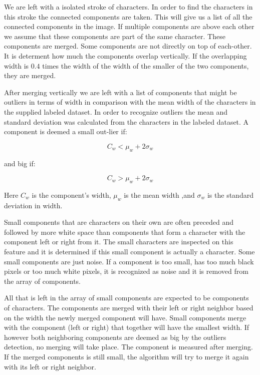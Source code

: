 

We are left with a isolated stroke of characters. In order to find the characters in this stroke the connected components are taken. This will give us a list of all the connected components in the image. If multiple components are above each other we assume that these components are part of the same character. These components are merged. Some components are not directly on top of each-other. It is determent how much the components overlap vertically. If the overlapping width is $0.4$ times the width of the width of the smaller of the two components, they are merged. 

After merging vertically we are left with a list of components that might be outliers in terms of width in comparison with the mean width of the characters in the supplied labeled dataset. In order to recognize outliers the mean and standard deviation was calculated from the characters in the labeled dataset. A component is deemed a small out-lier if:

\begin{equation}
C_w < \mu_w + 2 \sigma_w 
\end{equation}

and big if:

\begin{equation}
C_w > \mu_w + 2 \sigma_w 
\end{equation}

Here $C_w$ is the component's width, $\mu_w$ is the mean width ,and $\sigma_w$ is the standard deviation in width.


Small components that are characters on their own are often preceded and followed by more white space than components that form a character with the component left or right from it. The small characters are inspected on this feature and it is determined if this small component is actually a character. Some small components are just noise. If a component is too small, has too much black pixels or too much white pixels, it is recognized as noise and it is removed from the array of components. 


All that is left in the array of small components are expected to be components of characters. The components are merged with their left or right neighbor based on the width the newly merged component will have. Small components merge with the component (left or right) that together will have the smallest width. If however both neighboring components are deemed as big by the outliers detection, no merging will take place. The component is measured after merging. If the merged components is still small, the algorithm will try to merge it again with its left or right neighbor.

